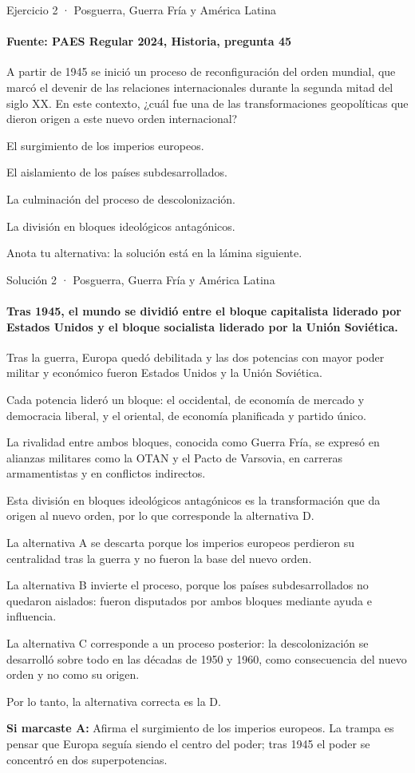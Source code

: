 \documentclass[aspectratio=169,11pt]{beamer}
\newcommand{\alternativa}[2]{\begin{opcion}\tecla{#1}\hspace{0.6em}#2\end{opcion}}
\newcommand{\paso}[2]{\par\noindent\makebox[1.4em][l]{\color{zinc500}\ttfamily\small #1}\parbox[t]{\dimexpr\linewidth-1.4em}{#2}\par\vspace{0.45em}}
\newcommand{\respuesta}[2]{\par\vspace{0.3em}\noindent\teclaok{#1}\hspace{0.5em}{\small\bfseries respuesta oficial}\hspace{0.5em}{\scriptsize\color{zinc500}#2}\par}
\newlength{\ajustealto}
\newenvironment{ajustar}[1][0.74\textheight]
  {\setlength{\ajustealto}{#1}\begin{lrbox}{\ajustecaja}\begin{minipage}{\textwidth}}
  {\end{minipage}\end{lrbox}%
   \ifdim\dimexpr\ht\ajustecaja+\dp\ajustecaja\relax>\ajustealto
     \resizebox*{!}{\ajustealto}{\usebox{\ajustecaja}}\else\usebox{\ajustecaja}\fi}
\begin{document}
\begin{frame}{Ejercicio 2 · Posguerra, Guerra Fría y América Latina}
\framesubtitle{Fuente: PAES Regular 2024, Historia, pregunta 45}
\begin{ajustar}[0.7\textheight]
{\small A partir de 1945 se inició un proceso de reconfiguración del orden mundial, que marcó el devenir de las relaciones internacionales durante la segunda mitad del siglo XX. En este contexto, ¿cuál fue una de las transformaciones geopolíticas que dieron origen a este nuevo orden internacional?}
\vspace{0.4em}
\alternativa{A}{El surgimiento de los imperios europeos.}
\alternativa{B}{El aislamiento de los países subdesarrollados.}
\alternativa{C}{La culminación del proceso de descolonización.}
\alternativa{D}{La división en bloques ideológicos antagónicos.}
\end{ajustar}
\vfill{\tiny\color{zinc500}\hfill Anota tu alternativa: la solución está en la lámina siguiente.}
\end{frame}

\begin{frame}{Solución 2 · Posguerra, Guerra Fría y América Latina}
\framesubtitle{Tras 1945, el mundo se dividió entre el bloque capitalista liderado por Estados Unidos y el bloque socialista liderado por la Unión Soviética.}
\begin{ajustar}[0.64\textheight]
{\footnotesize
\paso{1}{Tras la guerra, Europa quedó debilitada y las dos potencias con mayor poder militar y económico fueron Estados Unidos y la Unión Soviética.}
\paso{2}{Cada potencia lideró un bloque: el occidental, de economía de mercado y democracia liberal, y el oriental, de economía planificada y partido único.}
\paso{3}{La rivalidad entre ambos bloques, conocida como Guerra Fría, se expresó en alianzas militares como la OTAN y el Pacto de Varsovia, en carreras armamentistas y en conflictos indirectos.}
\paso{4}{Esta división en bloques ideológicos antagónicos es la transformación que da origen al nuevo orden, por lo que corresponde la alternativa D.}
\paso{5}{La alternativa A se descarta porque los imperios europeos perdieron su centralidad tras la guerra y no fueron la base del nuevo orden.}
\paso{6}{La alternativa B invierte el proceso, porque los países subdesarrollados no quedaron aislados: fueron disputados por ambos bloques mediante ayuda e influencia.}
\paso{7}{La alternativa C corresponde a un proceso posterior: la descolonización se desarrolló sobre todo en las décadas de 1950 y 1960, como consecuencia del nuevo orden y no como su origen.}
\paso{8}{Por lo tanto, la alternativa correcta es la D.}
}
\respuesta{D}{PAES Regular 2024, Historia, pregunta 45}
\begin{notagris}\scriptsize \textbf{Si marcaste A:} Afirma el surgimiento de los imperios europeos. La trampa es pensar que Europa seguía siendo el centro del poder; tras 1945 el poder se concentró en dos superpotencias.\end{notagris}
\end{ajustar}
\end{frame}
\end{document}
